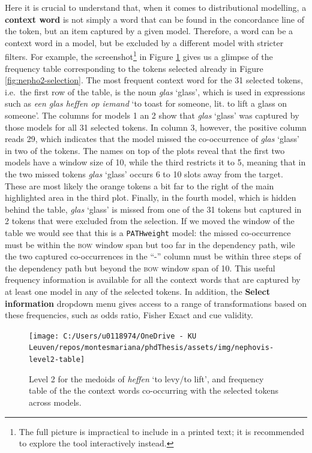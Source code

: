\documentclass[
]{book}
\begin{document}
Here it is crucial to understand that, when it comes to distributional modelling, a \textbf{context word} is not simply a word that can be found in the concordance line of the token, but an item captured by a given model. Therefore, a word can be a context word in a model, but be excluded by a different model with stricter filters. For example, the screenshot\footnote{The full picture is impractical to include in a printed text; it is recommended to explore the tool interactively instead.} in Figure \ref{fig:nepho2-table} gives us a glimpse of the frequency table corresponding to the tokens selected already in Figure \ref{fig:nepho2-selection}. The most frequent context word for the 31 selected tokens, i.e.~the first row of the table, is the noun \emph{glas} `glass', which is used in expressions such as \emph{een glas heffen op iemand} `to toast for someone, lit. to lift a glass on someone'. The columns for models 1 an 2 show that \emph{glas} `glass' was captured by those models for all 31 selected tokens. In column 3, however, the positive column reads 29, which indicates that the model missed the co-occurrence of \emph{glas} `glass' in two of the tokens. The names on top of the plots reveal that the first two models have a window size of 10, while the third restricts it to 5, meaning that in the two missed tokens \emph{glas} `glass' occurs 6 to 10 slots away from the target. These are most likely the orange tokens a bit far to the right of the main highlighted area in the third plot. Finally, in the fourth model, which is hidden behind the table, \emph{glas} `glass' is missed from one of the 31 tokens but captured in 2 tokens that were excluded from the selection. If we moved the window of the table we would see that this is a \texttt{PATHweight} model: the missed co-occurrence must be within the \textsc{bow} window span but too far in the dependency path, wile the two captured co-occurrences in the ``-'' column must be within three steps of the dependency path but beyond the \textsc{bow} window span of 10. This useful frequency information is available for all the context words that are captured by at least one model in any of the selected tokens. In addition, the \textbf{Select information} dropdown menu gives access to a range of transformations based on these frequencies, such as odds ratio, Fisher Exact and cue validity.



\begin{figure}
\texttt{[image: C:/Users/u0118974/OneDrive - KU Leuven/repos/montesmariana/phdThesis/assets/img/nephovis-level2-table]} \caption{Level 2 for the medoids of \emph{heffen} `to levy/to lift', and frequency table of the the context words co-occurring with the selected tokens across models.}\label{fig:nepho2-table}
\end{figure}
\end{document}
